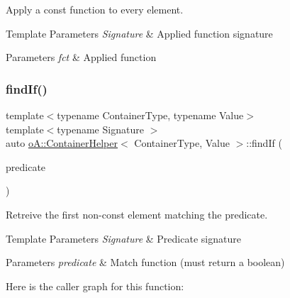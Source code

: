 Apply a const function to every element. 


\begin{DoxyTemplParams}{Template Parameters}
{\em Signature} & Applied function signature \\
\hline
\end{DoxyTemplParams}

\begin{DoxyParams}{Parameters}
{\em fct} & Applied function \\
\hline
\end{DoxyParams}
\mbox{\label{classo_a_1_1_container_helper_af2ed8bdecb2d870ba366ee56d7e6b90a}} 
\subsubsection{\texorpdfstring{find\+If()}{findIf()}\hspace{0.1cm}{\footnotesize\ttfamily [1/4]}}
{\footnotesize\ttfamily template$<$typename Container\+Type, typename Value$>$ \\
template$<$typename Signature $>$ \\
auto \mbox{\hyperlink{classo_a_1_1_container_helper}{o\+A\+::\+Container\+Helper}}$<$ Container\+Type, Value $>$\+::find\+If (\begin{DoxyParamCaption}\item[{const Signature \&}]{predicate }\end{DoxyParamCaption})\hspace{0.3cm}{\ttfamily [inline]}}



Retreive the first non-\/const element matching the predicate. 


\begin{DoxyTemplParams}{Template Parameters}
{\em Signature} & Predicate signature \\
\hline
\end{DoxyTemplParams}

\begin{DoxyParams}{Parameters}
{\em predicate} & Match function (must return a boolean) \\
\hline
\end{DoxyParams}
Here is the caller graph for this function\+:
\mbox{\label{classo_a_1_1_container_helper_accea76cd23603fc42db7b46081f5cc8d}} 

